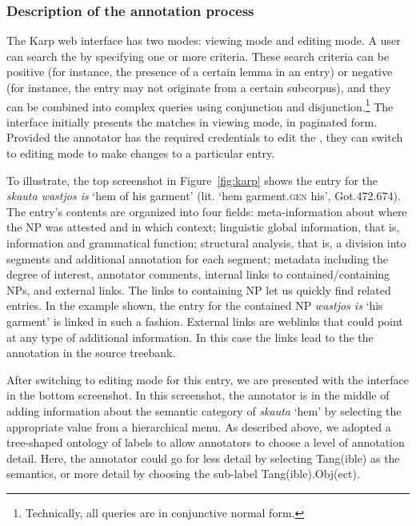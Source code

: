 \documentclass[output=paper,colorlinks,citecolor=brown]{langscibook}
\begin{document}
\subsubsection{Description of the annotation process}

The Karp web interface has two modes: viewing mode and editing mode. A user can search the  by specifying one or more criteria. These search criteria can be positive (for instance, the presence of a certain lemma in an entry) or negative (for instance, the entry may not originate from a certain subcorpus), and they can be combined into complex queries using conjunction and disjunction.\footnote{Technically, all queries are in conjunctive normal form.} The interface initially presents the  matches in viewing mode, in paginated form. Provided the annotator has the required credentials to edit the , they can switch to editing mode to make changes to a particular entry.

\begin{sloppypar}
To illustrate, the top screenshot in Figure~\ref{fig:karp} shows the
entry for the  \textit{skauta wastjos is} `hem of his garment' (lit. `hem garment.\textsc{gen} his', Got.472.674). The entry's contents are organized into four fields: meta-information about where the NP was attested and in which context; linguistic global information, that is,  information and
grammatical function; structural analysis, that is, a division into segments and additional annotation for each segment; metadata including the degree of interest, annotator comments, internal links to contained/containing NPs, and external links. The links to containing NP let us quickly find related entries. In the example shown, the entry for the contained NP \textit{wastjos is} `his garment' is linked in such a fashion. External links are weblinks that could point at any type of additional information. In this case the links lead to the the annotation in the source treebank.
\end{sloppypar}

After switching to editing mode for this entry, we are presented with the interface in the bottom screenshot. In this screenshot, the annotator is in the middle of adding information about the semantic category of 
\textit{skauta} `hem' by selecting the appropriate value from a hierarchical menu. As described above, we adopted a tree-shaped ontology of labels to allow annotators to choose a level of annotation detail. Here, the annotator could go for less detail by selecting Tang(ible) as the  semantics, or more detail by choosing the sub-label Tang(ible).Obj(ect).
\end{document}
